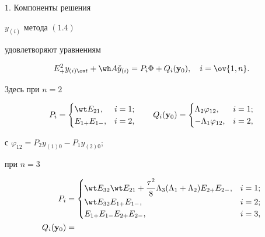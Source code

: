 \begin{thm} $1$. Компоненты решения


$y_{(i)}$ метода $(1.4)$


удовлетворяют уравнениям


\begin{equation}


E_+^2y_{(i)\ov t}+\wh A \Check y_{(i)}=P_i\Phi+Q_i({\bold y}_0),\quad


i=\ov{1,n}.


\end{equation}


Здесь при $n=2$ 


$$


P_i=


\begin{cases}


\wt E_{21},& i=1;\\


E_{1+}E_{1-},& i=2,


\end{cases}\qquad


Q_i({\bold y}_0)=


\begin{cases}


\Lambda_2\varphi_{12},& i=1;\\


-\Lambda_1\varphi_{12},& i=2,


\end{cases}


$$


с $\varphi_{12}=P_2y_{(1)0}-P_1y_{(2)0};$


при $n=3$


\begin{align*}


P_i&=


\begin{cases}


\wt E_{32}\wt E_{21}+\dfrac{\tau^2}{8}\Lambda_3


(\Lambda_1+\Lambda_2)E_{2+}E_{2-},& i=1;\\


\wt E_{32}E_{1+}E_{1-},& i=2;\\


E_{1+}E_{1-}E_{2+}E_{2-},& i=3,


\end{cases}


\\


Q_i({\bold y}_0)&=



\end{align*}
\end{thm}

